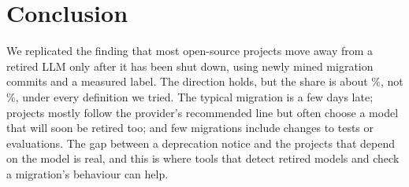 \section{Conclusion}\label{sec:conclusion}

We replicated the finding that most open-source projects move away from a retired LLM only after it has been shut down, using \MigrationsAway{} newly mined migration commits and a measured label. The direction holds, but the share is about \AfterLate\%, not \KimAfterShutdown\%, under every definition we tried. The typical migration is a few days late; projects mostly follow the provider's recommended line but often choose a model that will soon be retired too; and few migrations include changes to tests or evaluations. The gap between a deprecation notice and the projects that depend on the model is real, and this is where tools that detect retired models and check a migration's behaviour can help.
